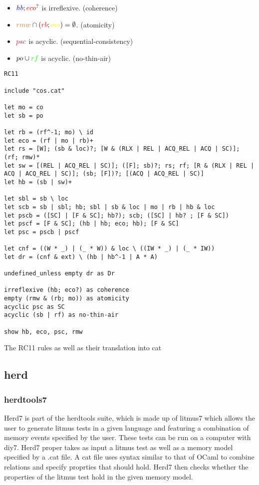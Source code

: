 \documentclass[a4,12pt]{article}
\newcommand{\hb}{{\color{blue}hb}}
\newcommand{\eco}{{\color{red}eco}}
\newcommand{\rmw}{{\color{brown}rmw}}
\newcommand{\rb}{{\color{red}rb}}
\newcommand{\mo}{{\color{yellow}mo}}
\newcommand{\psc}{{\color{Maroon}psc}}
\newcommand{\po}{po}
\newcommand{\rf}{{\color{green}rf}}
\begin{document}
\begin{itemize}
\item $\hb ; \eco ^?$ is irreflexive. \hfill (coherence)
\item $\rmw \cap (\rb ; \mo) = \emptyset$. \hfill (atomicity)
\item $\psc$ is acyclic. \hfill (sequential-consistency)
\item $\po \cup \rf$ is acyclic. \hfill (no-thin-air)
\end{itemize}


\begin{lstlisting}[breaklines=true]
RC11

include "cos.cat"

let mo = co
let sb = po

let rb = (rf^-1; mo) \ id
let eco = (rf | mo | rb)+
let rs = [W]; (sb & loc)?; [W & (RLX | REL | ACQ_REL | ACQ | SC)]; (rf; rmw)*
let sw = [(REL | ACQ_REL | SC)]; ([F]; sb)?; rs; rf; [R & (RLX | REL | ACQ | ACQ_REL | SC)]; (sb; [F])?; [(ACQ | ACQ_REL | SC)]
let hb = (sb | sw)+

let sbl = sb \ loc
let scb = sb | sbl; hb; sbl | sb & loc | mo | rb | hb & loc
let pscb = ([SC] | [F & SC]; hb?); scb; ([SC] | hb? ; [F & SC])
let pscf = [F & SC]; (hb | hb; eco; hb); [F & SC]
let psc = pscb | pscf

let cnf = ((W * _) | (_ * W)) & loc \ ((IW * _) | (_ * IW))
let dr = (cnf & ext) \ (hb | hb^-1 | A * A)

undefined_unless empty dr as Dr

irreflexive (hb; eco?) as coherence
empty (rmw & (rb; mo)) as atomicity
acyclic psc as SC
acyclic (sb | rf) as no-thin-air

show hb, eco, psc, rmw
\end{lstlisting}
{\footnotesize{The RC11 rules as well as their translation into cat}}

\subsection{herd}

\subsubsection{herdtools7}

Herd7 is part of the herdtools suite, which is made up of litmus7 which allows the user to generate litmus tests in a given language and featuring a combination of memory events specified by the user. These tests can be run on a computer with diy7. Herd7 proper takes as input a litmus test as well as a memory model specified by a .cat file. A cat file uses syntax similar to that of OCaml to combine relations and specify proprties that should hold. Herd7 then checks whether the properties of the litmus test hold in the given memory model.
\end{document}

